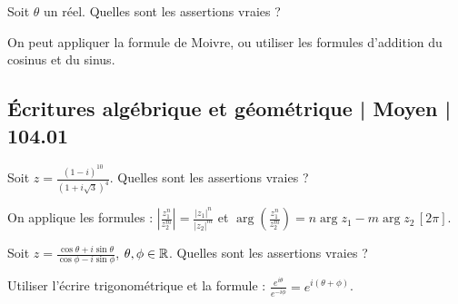 \begin{question} 
Soit $\theta$ un réel.  Quelles sont les assertions vraies ?
\begin{answers}
    \bad{$\cos(2\theta)= 2\cos\theta \sin \theta$}
    \good{ $\cos(2\theta)= \cos^2\theta -\sin^2 \theta$}

    \good{$\sin(2\theta)= 2\cos\theta \sin \theta$}

    \bad{$\sin(2\theta)= \cos^2\theta -\sin^2 \theta$}
\end{answers}
\begin{explanations}
On peut appliquer la formule de Moivre, ou utiliser les formules d'addition du cosinus et du sinus. 

\end{explanations}

\end{question}

\subsection{Écritures algébrique et géométrique | Moyen | 104.01}

\begin{question} 
Soit $z=\frac{(1-i)^{10}}{(1+i\sqrt 3)^4}$. Quelles sont les assertions vraies ?
\begin{answers}
    



 
\end{answers}
\begin{explanations}
On applique les formules :
$|\frac{z_1^n}{z_2^m}|= \frac{|z_1|^n}{|z_2|^m}$   et $\arg(\frac{z_1^n}{z_2^m})= n\arg z_1 - m\arg z_2 \, [2\pi]$. 
\end{explanations}

\end{question}






\begin{question} 
Soit $z=\frac{\cos \theta + i \sin \theta}{\cos \phi - i \sin \phi}$, $\theta, \phi \in \mathbb{R}$. 
Quelles sont les assertions vraies ?
\begin{answers}

    


 
\end{answers}
\begin{explanations}
Utiliser l'écrire trigonométrique et  la formule : $\frac{e^{i\theta}}{e^{-i\phi}}= e^{i(\theta + \phi)} $.
\end{explanations}

\end{question}


